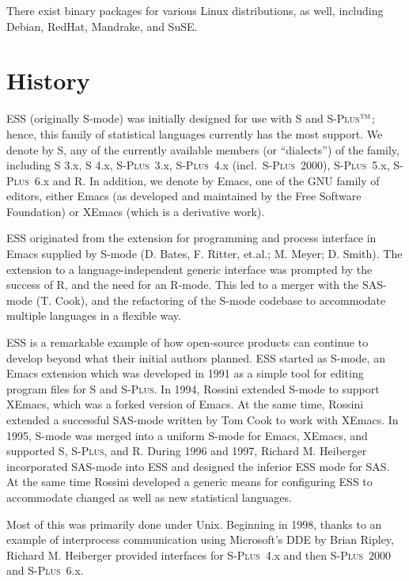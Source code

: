 \documentclass{article}
\newcommand*{\Splus}{\textsc{S-Plus}}
\newcommand{\tm}{$^{\mbox{\scriptsize\sc tm}}$}
\begin{document}
There exist binary packages for various Linux distributions, as well,
including Debian, RedHat, Mandrake, and SuSE.

\section{History}
\label{sec:history}

ESS (originally S-mode) was initially designed for use with S and
\Splus\tm; hence, this family of statistical languages currently has
the most support.  We denote by S, any of the currently available
members (or ``dialects'') of the family, including S 3.x, S 4.x, \Splus~3.x,
\Splus~4.x (incl.\ \Splus~2000), \Splus~5.x, \Splus~6.x and R.
In addition, we
denote by Emacs, one of the GNU family of editors, either Emacs (as
developed and maintained by the Free Software Foundation) or XEmacs (which
is a derivative work).

ESS originated from the extension for programming and process
interface in Emacs supplied by S-mode (D. Bates, F. Ritter, et.al.; 
M. Meyer; D. Smith).  The extension to a language-independent generic
interface was prompted by the success of R, and the need for an
R-mode.  This led to a merger with the SAS-mode (T. Cook), and the
refactoring of the S-mode codebase to accommodate multiple languages
in a flexible way.

ESS is a remarkable example of how open-source products can continue
to develop beyond what their initial authors planned.  ESS started as
S-mode, an Emacs extension which was developed in 1991 as a simple
tool for editing program files for S and \Splus.  In 1994, Rossini
extended S-mode to support XEmacs, which was a forked version of
Emacs.  At the same time, Rossini extended a successful SAS-mode
written by Tom Cook to work with XEmacs.  In 1995, S-mode was merged
into a uniform S-mode for Emacs, XEmacs, and supported S, \Splus, and
R.  During 1996 and 1997, Richard M. Heiberger incorporated 
SAS-mode into ESS and designed the inferior ESS mode for SAS.
At the same time Rossini developed a
generic means for configuring ESS to accommodate changed as well as
new statistical languages.

Most of this was primarily done under Unix.  Beginning in 1998, thanks
to an example of interprocess communication using Microsoft's DDE by
Brian Ripley, Richard M. Heiberger provided interfaces for \Splus~4.x
and then \Splus~2000 and \Splus~6.x.  
\end{document}
